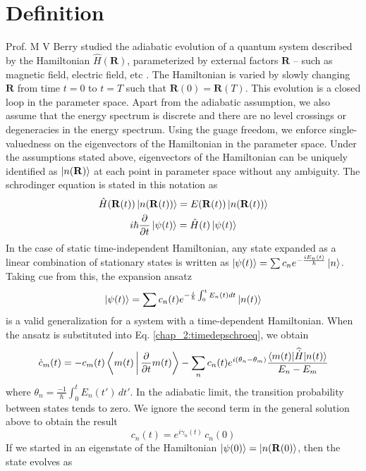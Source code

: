 \section{Definition}
Prof. M V Berry studied the adiabatic evolution of a quantum system described by the Hamiltonian $\hat{H}(\mathbf{R})$, parameterized by external factors $\mathbf{R}$ -- such as
magnetic field, electric field, etc \cite{berry1984quantal}. The Hamiltonian is varied by slowly changing $\mathbf{R}$ from time $t=0$ to $t=T$ such that $\mathbf{R}(0)=\mathbf{R}(T)$. This evolution is
a closed loop in the parameter space. Apart from the adiabatic assumption, we also assume that the energy spectrum is discrete and there are no level crossings or degeneracies in the 
energy spectrum. Using the guage freedom, we enforce single-valuedness on the eigenvectors of the Hamiltonian in the parameter space. 
Under the assumptions stated above, eigenvectors of the Hamiltonian can be uniquely identified as $\ket{n(\mathbf{R})}$ at each point in parameter space without any ambiguity.
The schrodinger equation is stated in this notation as 
\begin{gather}
 \hat{H}(\mathbf{R}(t))\ket{n(\mathbf{R}(t))} = E(\mathbf{R}(t))\ket{n(\mathbf{R}(t))} \\
 \label{chap_2:timedepschroeq} i\hbar\frac{\partial}{\partial t}\ket{\psi(t)} = \hat{H}(t)\ket{\psi(t)}
\end{gather} In the case of static time-independent Hamiltonian, any state expanded as a linear combination of stationary states is written as
$\ket{\psi(t)} = \sum{c_n e^{-\frac{i E_{n}(t)}{\hbar}} \ket{n}}$. Taking cue from this, the expansion ansatz
\begin{equation}
\ket{\psi(t)} = \sum{c_{n}(t) e^{-\frac{i}{\hbar}\int_{0}^{t}{E_{n}(t) dt}} \ket{n(t)}}
\end{equation} is a valid generalization for a system with a time-dependent Hamiltonian. When the ansatz is substituted into Eq. \eqref{chap_2:timedepschroeq}, we obtain
\begin{equation}
  \label{chap_2:coeffslinercomb}\dot{c}_{m}(t) = -c_{m}(t) \Braket{m(t) | \frac{\partial}{\partial t} m(t)} - \sum_{n}{c_{n}(t) e^{i (\theta_n - \theta_m)} \frac{\braket{m(t)|\widehat{\dot{H}}|n(t)}}{E_n - E_m}}
\end{equation} where $\theta_n = \frac{-1}{\hbar}\int_{0}^{t}{E_n(t')\,dt'}$. In the adiabatic limit, the transition probability between states tends to zero.
We ignore the second term in the general solution above to obtain the result
\begin{equation}
 c_{n}(t) = e^{i \gamma_{n}(t)}\,c_{n}(0)
\end{equation} If we started in an eigenstate of the Hamiltonian $\ket{\psi(0)} = \ket{n(\mathbf{R}(0)}$, then the state evolves as
